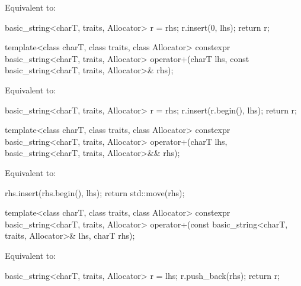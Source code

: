 \begin{itemdescr}
\pnum
\effects
Equivalent to:
\begin{codeblock}
basic_string<charT, traits, Allocator> r = rhs;
r.insert(0, lhs);
return r;
\end{codeblock}
\end{itemdescr}

%
\begin{itemdecl}
template<class charT, class traits, class Allocator>
  constexpr basic_string<charT, traits, Allocator>
    operator+(charT lhs, const basic_string<charT, traits, Allocator>& rhs);
\end{itemdecl}

\begin{itemdescr}
\pnum
\effects
Equivalent to:
\begin{codeblock}
basic_string<charT, traits, Allocator> r = rhs;
r.insert(r.begin(), lhs);
return r;
\end{codeblock}
\end{itemdescr}

%
\begin{itemdecl}
template<class charT, class traits, class Allocator>
  constexpr basic_string<charT, traits, Allocator>
    operator+(charT lhs, basic_string<charT, traits, Allocator>&& rhs);
\end{itemdecl}

\begin{itemdescr}
\pnum
\effects
Equivalent to:
\begin{codeblock}
rhs.insert(rhs.begin(), lhs);
return std::move(rhs);
\end{codeblock}
\end{itemdescr}

%
\begin{itemdecl}
template<class charT, class traits, class Allocator>
  constexpr basic_string<charT, traits, Allocator>
    operator+(const basic_string<charT, traits, Allocator>& lhs, charT rhs);
\end{itemdecl}

\begin{itemdescr}
\pnum
\effects
Equivalent to:
\begin{codeblock}
basic_string<charT, traits, Allocator> r = lhs;
r.push_back(rhs);
return r;
\end{codeblock}
\end{itemdescr}

